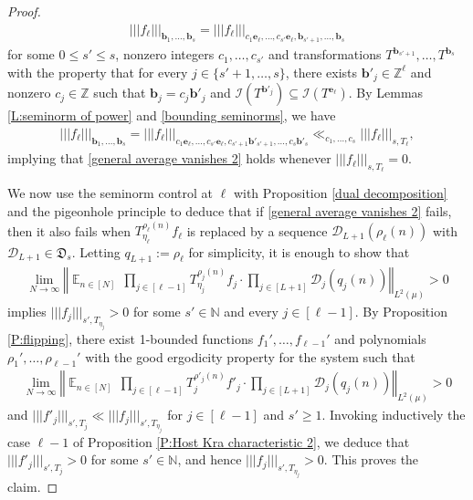 \documentclass[11pt]{amsart}
\theoremstyle{definition}
\newcommand{\N}{{\mathbb N}}
\newcommand{\Z}{{\mathbb Z}}
\newcommand{\CD}{{\mathcal D}}
\newcommand{\CI}{{\mathcal I}}
\newcommand{\FD}{{\mathfrak D}}
\newcommand{\be}{{\mathbf{e}}}
\renewcommand{\b}{{\textbf{b}}}
\newcommand{\norm}[1]{\left\Vert #1\right\Vert}
\newcommand{\nnorm}[1]{\lvert\!|\!| #1|\!|\!\rvert}
\DeclareMathOperator*{\E}{\mathbb{E}}
\begin{document}
\begin{proof}
\begin{align*}
    \nnorm{f_\ell}_{\b_1, \ldots, \b_s} =  \nnorm{f_\ell}_{c_1 \be_\ell, \ldots, c_{s'} \be_\ell, \b_{s'+1}, \ldots, \b_{s}}
\end{align*}
for some $0 \leq s'\leq s$, nonzero integers $c_1, \ldots, c_{s'}$ and transformations $T^{\b_{s'+1}}, \ldots, T^{\b_s}$ with the property that for every $j\in\{s'+1, \ldots, s\}$, there exists $\b'_j\in\Z^\ell$ and nonzero $c_j\in\Z$ such that $\b_j = c_j \b'_j$ and $\CI(T^{\b'_j})\subseteq\CI(T^{\be_\ell})$. By Lemmas \ref{L:seminorm of power} and \ref{bounding seminorms}, we have
\begin{align*}
    \nnorm{f_\ell}_{\b_1, \ldots, \b_s}= \nnorm{f_\ell}_{c_1 \be_\ell, \ldots, c_{s'} \be_\ell, c_{s'+1}\b'_{s'+1}, \ldots, c_s \b'_s}\ll_{c_1, \ldots, c_s}\nnorm{f_\ell}_{s, T_\ell},
\end{align*}
implying that \eqref{general average vanishes 2} holds whenever $\nnorm{f_\ell}_{s, T_\ell} = 0$.

We now use the seminorm control at $\ell$ with Proposition \ref{dual decomposition} and the pigeonhole principle to deduce that if \eqref{general average vanishes 2} fails, then it also fails when $T_{\eta_\ell}^{\rho_\ell(n)} f_\ell$ is replaced by a sequence $\CD_{L+1}(\rho_\ell(n))$ with $\CD_{L+1}\in\FD_s$. Letting $q_{L+1} := \rho_\ell$ for simplicity, it is enough to show that
	\begin{align*}%
	    \lim_{N\to\infty}\norm{\E_{n\in [N]} \,\prod_{j\in[\ell-1]}T_{{\eta_j}}^{\rho_j(n)}f_j \cdot \prod_{j\in[L+1]}\CD_{j}(q_j(n))}_{L^2(\mu)} >0
	\end{align*}
implies $\nnorm{f_j}_{s', T_{\eta_j}} > 0$ for some $s'\in\N$ and every $j\in[\ell-1]$. By Proposition \ref{P:flipping}, there exist 1-bounded functions $f_1', \ldots, f_{\ell-1}'$ and polynomials $\rho_1', \ldots, \rho_{\ell-1}'$ with the good ergodicity property for the system such that
\begin{align*}
    \lim_{N\to\infty}\norm{\E_{n\in [N]} \,\prod_{j\in[\ell-1]}T_{{j}}^{\rho'_j(n)}f'_j \cdot \prod_{j\in[L+1]}\CD_{j}(q_j(n))}_{L^2(\mu)} >0
\end{align*}
and $\nnorm{f'_j}_{s', T_j} \ll \nnorm{f_j}_{s', T_{\eta_j}}$ for $j\in[\ell-1]$ and $s'\geq 1$. Invoking inductively the case $\ell-1$ of Proposition \ref{P:Host Kra characteristic 2}, we deduce that $\nnorm{f'_j}_{s', T_j}>0$ for some $s'\in\N$, and hence $\nnorm{f_j}_{s', T_{\eta_j}}>0$. This proves the claim.
\end{proof}
\end{document}
